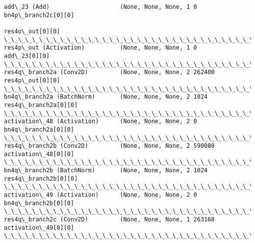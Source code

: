 \documentclass[11pt]{article}
\begin{document}
\begin{Verbatim}[commandchars=\\\{\}]
add\_23 (Add)                    (None, None, None, 1 0           bn4p\_branch2c[0][0]              
                                                                 res4o\_out[0][0]                  
\_\_\_\_\_\_\_\_\_\_\_\_\_\_\_\_\_\_\_\_\_\_\_\_\_\_\_\_\_\_\_\_\_\_\_\_\_\_\_\_\_\_\_\_\_\_\_\_\_\_\_\_\_\_\_\_\_\_\_\_\_\_\_\_\_\_\_\_\_\_\_\_\_\_\_\_\_\_\_\_\_\_\_\_\_\_\_\_\_\_\_\_\_\_\_\_\_\_
res4p\_out (Activation)          (None, None, None, 1 0           add\_23[0][0]                     
\_\_\_\_\_\_\_\_\_\_\_\_\_\_\_\_\_\_\_\_\_\_\_\_\_\_\_\_\_\_\_\_\_\_\_\_\_\_\_\_\_\_\_\_\_\_\_\_\_\_\_\_\_\_\_\_\_\_\_\_\_\_\_\_\_\_\_\_\_\_\_\_\_\_\_\_\_\_\_\_\_\_\_\_\_\_\_\_\_\_\_\_\_\_\_\_\_\_
res4q\_branch2a (Conv2D)         (None, None, None, 2 262400      res4p\_out[0][0]                  
\_\_\_\_\_\_\_\_\_\_\_\_\_\_\_\_\_\_\_\_\_\_\_\_\_\_\_\_\_\_\_\_\_\_\_\_\_\_\_\_\_\_\_\_\_\_\_\_\_\_\_\_\_\_\_\_\_\_\_\_\_\_\_\_\_\_\_\_\_\_\_\_\_\_\_\_\_\_\_\_\_\_\_\_\_\_\_\_\_\_\_\_\_\_\_\_\_\_
bn4q\_branch2a (BatchNorm)       (None, None, None, 2 1024        res4q\_branch2a[0][0]             
\_\_\_\_\_\_\_\_\_\_\_\_\_\_\_\_\_\_\_\_\_\_\_\_\_\_\_\_\_\_\_\_\_\_\_\_\_\_\_\_\_\_\_\_\_\_\_\_\_\_\_\_\_\_\_\_\_\_\_\_\_\_\_\_\_\_\_\_\_\_\_\_\_\_\_\_\_\_\_\_\_\_\_\_\_\_\_\_\_\_\_\_\_\_\_\_\_\_
activation\_48 (Activation)      (None, None, None, 2 0           bn4q\_branch2a[0][0]              
\_\_\_\_\_\_\_\_\_\_\_\_\_\_\_\_\_\_\_\_\_\_\_\_\_\_\_\_\_\_\_\_\_\_\_\_\_\_\_\_\_\_\_\_\_\_\_\_\_\_\_\_\_\_\_\_\_\_\_\_\_\_\_\_\_\_\_\_\_\_\_\_\_\_\_\_\_\_\_\_\_\_\_\_\_\_\_\_\_\_\_\_\_\_\_\_\_\_
res4q\_branch2b (Conv2D)         (None, None, None, 2 590080      activation\_48[0][0]              
\_\_\_\_\_\_\_\_\_\_\_\_\_\_\_\_\_\_\_\_\_\_\_\_\_\_\_\_\_\_\_\_\_\_\_\_\_\_\_\_\_\_\_\_\_\_\_\_\_\_\_\_\_\_\_\_\_\_\_\_\_\_\_\_\_\_\_\_\_\_\_\_\_\_\_\_\_\_\_\_\_\_\_\_\_\_\_\_\_\_\_\_\_\_\_\_\_\_
bn4q\_branch2b (BatchNorm)       (None, None, None, 2 1024        res4q\_branch2b[0][0]             
\_\_\_\_\_\_\_\_\_\_\_\_\_\_\_\_\_\_\_\_\_\_\_\_\_\_\_\_\_\_\_\_\_\_\_\_\_\_\_\_\_\_\_\_\_\_\_\_\_\_\_\_\_\_\_\_\_\_\_\_\_\_\_\_\_\_\_\_\_\_\_\_\_\_\_\_\_\_\_\_\_\_\_\_\_\_\_\_\_\_\_\_\_\_\_\_\_\_
activation\_49 (Activation)      (None, None, None, 2 0           bn4q\_branch2b[0][0]              
\_\_\_\_\_\_\_\_\_\_\_\_\_\_\_\_\_\_\_\_\_\_\_\_\_\_\_\_\_\_\_\_\_\_\_\_\_\_\_\_\_\_\_\_\_\_\_\_\_\_\_\_\_\_\_\_\_\_\_\_\_\_\_\_\_\_\_\_\_\_\_\_\_\_\_\_\_\_\_\_\_\_\_\_\_\_\_\_\_\_\_\_\_\_\_\_\_\_
res4q\_branch2c (Conv2D)         (None, None, None, 1 263168      activation\_49[0][0]              
\_\_\_\_\_\_\_\_\_\_\_\_\_\_\_\_\_\_\_\_\_\_\_\_\_\_\_\_\_\_\_\_\_\_\_\_\_\_\_\_\_\_\_\_\_\_\_\_\_\_\_\_\_\_\_\_\_\_\_\_\_\_\_\_\_\_\_\_\_\_\_\_\_\_\_\_\_\_\_\_\_\_\_\_\_\_\_\_\_\_\_\_\_\_\_\_\_\_

\end{Verbatim}
\end{document}

